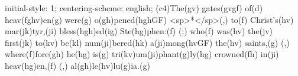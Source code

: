 initial-style: 1;
centering-scheme: english;
(c4)The(gv) gates(gvgf) of(d) heav(fghv)en(g) were(g) o(gh)pened(hghGF) <sp>*</sp>(,) to(f) Christ's(hv) mar(jk)tyr,(ji) bless(hgh)ed(ig) Ste(hg)phen:(f) (;) who(f) was(hv) the(jv) first(jk) to(kv) be(kl) num(ji)bered(hk) a(ji)mong(hvGF) the(hv) saints,(g) (,) where(f)fore(gh) he(hg) is(g) tri(kv)um(ji)phant(g)ly(hg) crowned(fh) in(ji) heav(hg)en,(f) (,) al(gh)le(hv)lu(g)ia.(g)
